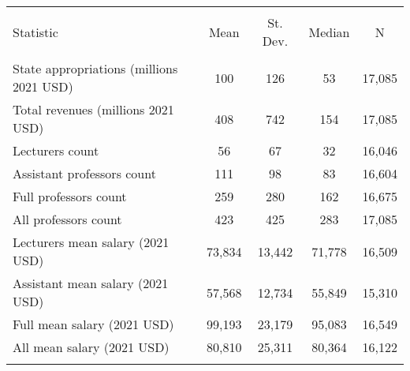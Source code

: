 
\begin{tabular}{@{\extracolsep{5pt}}lcccc} 
\\[-1.8ex]\hline 
\hline \\[-1.8ex] 
Statistic & \multicolumn{1}{c}{Mean} & \multicolumn{1}{c}{St. Dev.} & \multicolumn{1}{c}{Median} & \multicolumn{1}{c}{N} \\ 
\hline \\[-1.8ex] 
State appropriations (millions 2021 USD) & 100 & 126 & 53 & 17,085 \\ 
Total revenues (millions 2021 USD) & 408 & 742 & 154 & 17,085 \\ 
Lecturers count & 56 & 67 & 32 & 16,046 \\ 
Assistant professors count & 111 & 98 & 83 & 16,604 \\ 
Full professors count & 259 & 280 & 162 & 16,675 \\ 
All professors count & 423 & 425 & 283 & 17,085 \\ 
Lecturers mean salary (2021 USD) & 73,834 & 13,442 & 71,778 & 16,509 \\ 
Assistant mean salary (2021 USD) & 57,568 & 12,734 & 55,849 & 15,310 \\ 
Full mean salary (2021 USD) & 99,193 & 23,179 & 95,083 & 16,549 \\ 
All mean salary (2021 USD) & 80,810 & 25,311 & 80,364 & 16,122 \\ 
\hline \\[-1.8ex] 
\end{tabular} 
